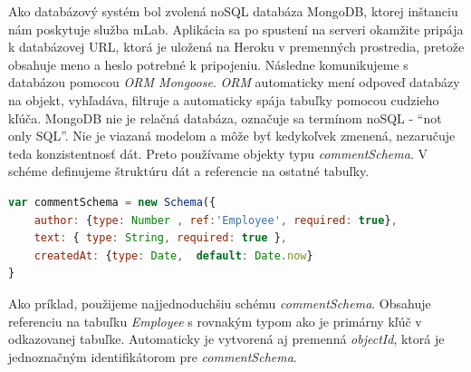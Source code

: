 Ako databázový systém bol zvolená  noSQL databáza MongoDB, ktorej inštanciu nám poskytuje služba mLab. Aplikácia sa po spustení na serveri okamžite pripája k databázovej URL, ktorá je  uložená na Heroku v premenných prostredia, pretože obsahuje meno a heslo potrebné k pripojeniu. Následne komunikujeme s databázou pomocou \textit{ORM Mongoose}. \textit{ORM} automaticky mení odpoveď databázy na objekt, vyhľadáva, filtruje a automaticky spája tabuľky pomocou cudzieho kľúča. MongoDB nie je relačná databáza, označuje sa termínom noSQL  - ``not only SQL''. Nie je viazaná modelom a môže byť kedykoľvek zmenená, nezaručuje teda konzistentnosť dát. Preto používame objekty typu \textit{commentSchema}. V schéme  definujeme štruktúru dát a referencie na ostatné tabuľky.
\vspace{10pt}

\begin{lstlisting}[language=JavaScript]
var commentSchema = new Schema({	
    author: {type: Number , ref:'Employee', required: true},
    text: { type: String, required: true },    
    createdAt: {type: Date,  default: Date.now}
}
\end{lstlisting}

Ako príklad, použijeme najjednoduchšiu schému \textit{commentSchema}. Obsahuje referenciu na tabuľku \textit{Employee} s rovnakým typom ako je primárny kľúč v odkazovanej tabuľke. Automaticky je vytvorená aj premenná \textit{objectId}, ktorá je jednoznačným identifikátorom  pre \textit{commentSchema}. 
\vspace{10pt}



